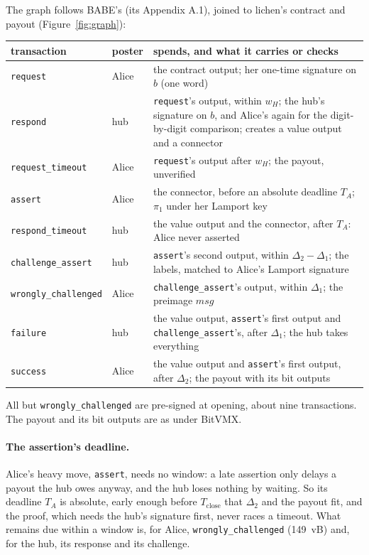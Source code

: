 \documentclass[11pt]{article}
\newcommand{\Tc}{T_{\mathrm{close}}}
\newcommand{\tx}[1]{\texttt{#1}}
\begin{document}
The graph follows BABE's (its Appendix A.1), joined to lichen's contract
and payout (Figure~\ref{fig:graph}):
\begin{center}
\small
\begin{tabularx}{\linewidth}{>{\raggedright\arraybackslash}p{30mm}p{12mm}L}
\toprule
transaction & poster & spends, and what it carries or checks \\
\midrule
\tx{request} & Alice & the contract output; her one-time signature on $b$ (one word) \\
\tx{respond} & hub & \tx{request}'s output, within $w_H$; the hub's signature on $b$, and Alice's again for the digit-by-digit comparison; creates a value output and a connector \\
\tx{request\_timeout} & Alice & \tx{request}'s output after $w_H$; the payout, unverified \\
\tx{assert} & Alice & the connector, before an absolute deadline $T_A$; $\pi_1$ under her Lamport key \\
\tx{respond\_timeout} & hub & the value output and the connector, after $T_A$: Alice never asserted \\
\tx{challenge\_assert} & hub & \tx{assert}'s second output, within $\Delta_2 - \Delta_1$; the labels, matched to Alice's Lamport signature \\
\tx{wrongly\_challenged} & Alice & \tx{challenge\_assert}'s output, within $\Delta_1$; the preimage $\mathit{msg}$ \\
\tx{failure} & hub & the value output, \tx{assert}'s first output and \tx{challenge\_assert}'s, after $\Delta_1$; the hub takes everything \\
\tx{success} & Alice & the value output and \tx{assert}'s first output, after $\Delta_2$; the payout with its bit outputs \\
\bottomrule
\end{tabularx}
\end{center}
All but \tx{wrongly\_challenged} are pre-signed at opening, about nine
transactions. The payout and its bit outputs are as under BitVMX.

\paragraph{The assertion's deadline.} Alice's heavy move, \tx{assert},
needs no window: a late assertion only delays a payout the hub owes
anyway, and the hub loses nothing by waiting. So its deadline $T_A$ is
absolute, early enough before $\Tc$ that $\Delta_2$ and the payout fit,
and the proof, which needs the hub's signature first, never races a
timeout. What remains due within a window is, for Alice,
\tx{wrongly\_challenged} (149~vB) and, for the hub, its response and its
challenge.
\end{document}
